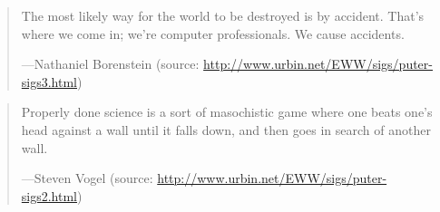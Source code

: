 \documentclass[a4paper]{article}
\begin{document}
\medskip
\begin{quote}
	The most likely way for the world to be destroyed is by
	accident.  That's where we come in; we're computer professionals.
	We cause accidents.

	---Nathaniel Borenstein (source:
	\url{http://www.urbin.net/EWW/sigs/puter-sigs3.html})
\end{quote}

\medskip
\begin{quote}
	Properly done science is a sort of masochistic game where one
	beats one's head against a wall until it falls down, and then
	goes in search of another wall.

	---Steven Vogel (source:
	\url{http://www.urbin.net/EWW/sigs/puter-sigs2.html})
\end{quote}
\end{document}
